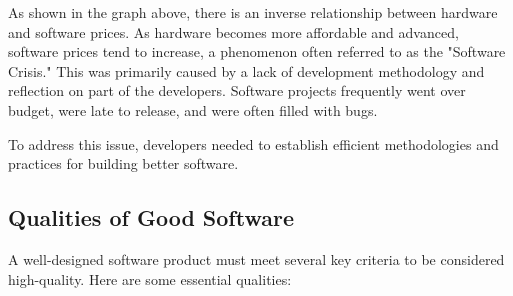 As shown in the graph above, there is an inverse relationship between hardware and software prices. As hardware becomes more affordable and advanced, software prices tend to increase, a phenomenon often referred to as the "Software Crisis." This was primarily caused by a lack of development methodology and reflection on part of the developers. Software projects frequently went over budget, were late to release, and were often filled with bugs.

To address this issue, developers needed to establish efficient methodologies and practices for building better software.

\subsection{Qualities of Good Software}


A well-designed software product must meet several key criteria to be considered high-quality. Here are some essential qualities:

